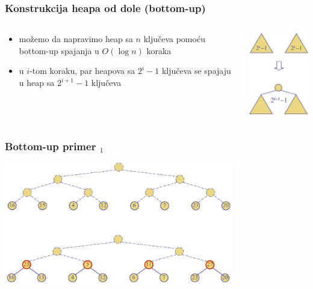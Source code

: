\documentclass[compress,aspectratio=169]{beamer}
\begin{document}
\begin{frame}[fragile]
  \frametitle{Konstrukcija heapa od dole (bottom-up)}
  \begin{columns}
    \begin{column}[c]{6cm}
      \begin{itemize}
        \item možemo da napravimo heap sa $n$ ključeva pomoću bottom-up
        spajanja u $O(\log n)$ koraka
        \item u $i$-tom koraku, par heapova sa $2^i-1$ ključeva se spajaju u
        heap sa $2^{i+1}-1$ ključeva
        \end{itemize}
    \end{column}
    \begin{column}[c]{5cm}
      \begin{center}
        \includegraphics[width=4cm]{asp-09-pic13.png}
      \end{center}
    \end{column}
  \end{columns}
\end{frame}

\begin{frame}[fragile]
  \frametitle{Bottom-up primer $_1$}
  \begin{center}
    \includegraphics[width=10cm]{asp-09-pic14.png}
  \end{center}
\end{frame}
\end{document}
